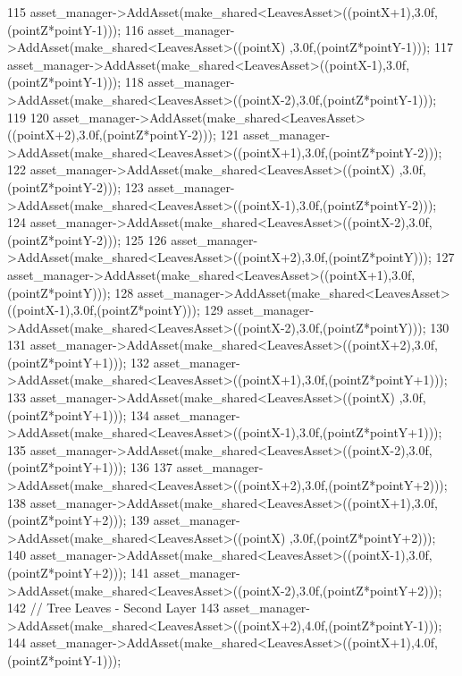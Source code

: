 \begin{DoxyCode}
115             asset\_manager->AddAsset(make\_shared<LeavesAsset>((pointX+1),3.0f,(pointZ*pointY-1)));
116             asset\_manager->AddAsset(make\_shared<LeavesAsset>((pointX)  ,3.0f,(pointZ*pointY-1)));
117             asset\_manager->AddAsset(make\_shared<LeavesAsset>((pointX-1),3.0f,(pointZ*pointY-1)));
118             asset\_manager->AddAsset(make\_shared<LeavesAsset>((pointX-2),3.0f,(pointZ*pointY-1)));
119 
120             asset\_manager->AddAsset(make\_shared<LeavesAsset>((pointX+2),3.0f,(pointZ*pointY-2)));
121             asset\_manager->AddAsset(make\_shared<LeavesAsset>((pointX+1),3.0f,(pointZ*pointY-2)));
122             asset\_manager->AddAsset(make\_shared<LeavesAsset>((pointX)  ,3.0f,(pointZ*pointY-2)));
123             asset\_manager->AddAsset(make\_shared<LeavesAsset>((pointX-1),3.0f,(pointZ*pointY-2)));
124             asset\_manager->AddAsset(make\_shared<LeavesAsset>((pointX-2),3.0f,(pointZ*pointY-2)));
125 
126             asset\_manager->AddAsset(make\_shared<LeavesAsset>((pointX+2),3.0f,(pointZ*pointY)));
127             asset\_manager->AddAsset(make\_shared<LeavesAsset>((pointX+1),3.0f,(pointZ*pointY)));
128             asset\_manager->AddAsset(make\_shared<LeavesAsset>((pointX-1),3.0f,(pointZ*pointY)));
129             asset\_manager->AddAsset(make\_shared<LeavesAsset>((pointX-2),3.0f,(pointZ*pointY))); 
130 
131             asset\_manager->AddAsset(make\_shared<LeavesAsset>((pointX+2),3.0f,(pointZ*pointY+1)));
132             asset\_manager->AddAsset(make\_shared<LeavesAsset>((pointX+1),3.0f,(pointZ*pointY+1)));
133             asset\_manager->AddAsset(make\_shared<LeavesAsset>((pointX)  ,3.0f,(pointZ*pointY+1)));
134             asset\_manager->AddAsset(make\_shared<LeavesAsset>((pointX-1),3.0f,(pointZ*pointY+1)));
135             asset\_manager->AddAsset(make\_shared<LeavesAsset>((pointX-2),3.0f,(pointZ*pointY+1)));
136  
137             asset\_manager->AddAsset(make\_shared<LeavesAsset>((pointX+2),3.0f,(pointZ*pointY+2)));
138             asset\_manager->AddAsset(make\_shared<LeavesAsset>((pointX+1),3.0f,(pointZ*pointY+2)));
139             asset\_manager->AddAsset(make\_shared<LeavesAsset>((pointX)  ,3.0f,(pointZ*pointY+2)));
140             asset\_manager->AddAsset(make\_shared<LeavesAsset>((pointX-1),3.0f,(pointZ*pointY+2)));
141             asset\_manager->AddAsset(make\_shared<LeavesAsset>((pointX-2),3.0f,(pointZ*pointY+2)));
142             \textcolor{comment}{// Tree Leaves - Second Layer}
143             asset\_manager->AddAsset(make\_shared<LeavesAsset>((pointX+2),4.0f,(pointZ*pointY-1)));
144             asset\_manager->AddAsset(make\_shared<LeavesAsset>((pointX+1),4.0f,(pointZ*pointY-1)));

\end{DoxyCode}
